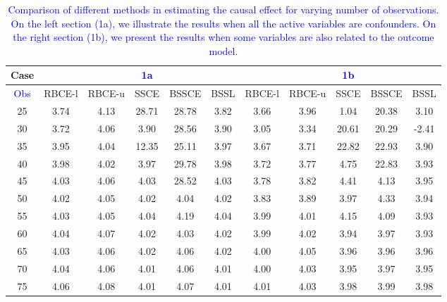 \documentclass[preprint,12pt]{elsarticle}
\newcommand{\added}[1]{\textcolor{blue}{#1}}
\begin{document}
\begin{table}
\centering
\tiny
\caption{\added{Comparison of different methods in estimating the causal effect for varying number of observations. On the left section (1a), we illustrate the results when all the active variables are confounders. On the right section (1b), we present the results when some variables are also related to the outcome model.}}
\begin{tabular}{c|ccccc|ccccc}
  \hline
 Case&  &  & \added{1a} &  &  &  &  & \added{1b} &  &  \\ 
  \hline
\added{Obs} & RBCE-l & RBCE-u & SSCE & BSSCE & BSSL & RBCE-l & RBCE-u & SSCE & BSSCE & BSSL \\ 
  \hline
25 & 3.74 & 4.13 & 28.71 & 28.78 & 3.82 & 3.66 & 3.96 & 1.04 & 20.38 & 3.10 \\ 
30 & 3.72 & 4.06 & 3.90 & 28.56 & 3.90 & 3.05 & 3.34 & 20.61 & 20.29 & -2.41 \\ 
35 & 3.95 & 4.04 & 12.35 & 25.11 & 3.97 & 3.67 & 3.71 & 22.82 & 22.93 & 3.90 \\ 
40 & 3.98 & 4.02 & 3.97 & 29.78 & 3.98 & 3.72 & 3.77 & 4.75 & 22.83 & 3.93 \\ 
45 & 4.03 & 4.06 & 4.03 & 28.52 & 4.03 & 3.78 & 3.82 & 4.41 & 4.13 & 3.95 \\ 
50 & 4.02 & 4.05 & 4.02 & 4.04 & 4.02 & 3.83 & 3.89 & 3.97 & 4.33 & 3.94 \\ 
55 & 4.03 & 4.05 & 4.04 & 4.19 & 4.04 & 3.99 & 4.01 & 4.15 & 4.09 & 3.93 \\ 
60 & 4.04 & 4.07 & 4.02 & 4.03 & 4.02 & 3.99 & 4.02 & 3.94 & 3.97 & 3.93 \\ 
65 & 4.03 & 4.06 & 4.02 & 4.06 & 4.02 & 4.00 & 4.05 & 3.96 & 3.96 & 3.96 \\ 
70 & 4.04 & 4.06 & 4.01 & 4.06 & 4.01 & 4.00 & 4.03 & 3.95 & 3.97 & 3.95 \\ 
75 & 4.06 & 4.08 & 4.01 & 4.07 & 4.01 & 4.01 & 4.03 & 3.98 & 3.99 & 3.98 \\ 
\hline
\end{tabular}
\label{tab:causal1}
\end{table}
\end{document}
